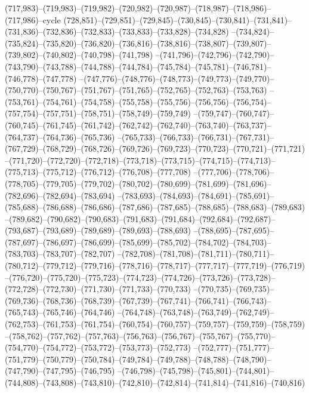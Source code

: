 (717,983)--(719,983)--(719,982)--(720,982)--(720,987)--(718,987)--(718,986)--(717,986)--cycle
(728,851)--(729,851)--(729,845)--(730,845)--(730,841)--(731,841)--(731,836)--(732,836)--(732,833)--(733,833)--(733,828)--(734,828)
--(734,824)--(735,824)--(735,820)--(736,820)--(736,816)--(738,816)--(738,807)--(739,807)--(739,802)--(740,802)--(740,798)--(741,798)
--(741,796)--(742,796)--(742,790)--(743,790)--(743,788)--(744,788)--(744,784)--(745,784)--(745,781)--(746,781)--(746,778)--(747,778)
--(747,776)--(748,776)--(748,773)--(749,773)--(749,770)--(750,770)--(750,767)--(751,767)--(751,765)--(752,765)--(752,763)--(753,763)
--(753,761)--(754,761)--(754,758)--(755,758)--(755,756)--(756,756)--(756,754)--(757,754)--(757,751)--(758,751)--(758,749)--(759,749)
--(759,747)--(760,747)--(760,745)--(761,745)--(761,742)--(762,742)--(762,740)--(763,740)--(763,737)--(764,737)--(764,736)--(765,736)
--(765,733)--(766,733)--(766,731)--(767,731)--(767,729)--(768,729)--(768,726)--(769,726)--(769,723)--(770,723)--(770,721)--(771,721)
--(771,720)--(772,720)--(772,718)--(773,718)--(773,715)--(774,715)--(774,713)--(775,713)--(775,712)--(776,712)--(776,708)--(777,708)
--(777,706)--(778,706)--(778,705)--(779,705)--(779,702)--(780,702)--(780,699)--(781,699)--(781,696)--(782,696)--(782,694)--(783,694)
--(783,693)--(784,693)--(784,691)--(785,691)--(785,688)--(786,688)--(786,686)--(787,686)--(787,685)--(788,685)--(788,683)--(789,683)
--(789,682)--(790,682)--(790,683)--(791,683)--(791,684)--(792,684)--(792,687)--(793,687)--(793,689)--(789,689)--(789,693)--(788,693)
--(788,695)--(787,695)--(787,697)--(786,697)--(786,699)--(785,699)--(785,702)--(784,702)--(784,703)--(783,703)--(783,707)--(782,707)
--(782,708)--(781,708)--(781,711)--(780,711)--(780,712)--(779,712)--(779,716)--(778,716)--(778,717)--(777,717)--(777,719)--(776,719)
--(776,720)--(775,720)--(775,723)--(774,723)--(774,726)--(773,726)--(773,728)--(772,728)--(772,730)--(771,730)--(771,733)--(770,733)
--(770,735)--(769,735)--(769,736)--(768,736)--(768,739)--(767,739)--(767,741)--(766,741)--(766,743)--(765,743)--(765,746)--(764,746)
--(764,748)--(763,748)--(763,749)--(762,749)--(762,753)--(761,753)--(761,754)--(760,754)--(760,757)--(759,757)--(759,759)--(758,759)
--(758,762)--(757,762)--(757,763)--(756,763)--(756,767)--(755,767)--(755,770)--(754,770)--(754,772)--(753,772)--(753,773)--(752,773)
--(752,777)--(751,777)--(751,779)--(750,779)--(750,784)--(749,784)--(749,788)--(748,788)--(748,790)--(747,790)--(747,795)--(746,795)
--(746,798)--(745,798)--(745,801)--(744,801)--(744,808)--(743,808)--(743,810)--(742,810)--(742,814)--(741,814)--(741,816)--(740,816)
